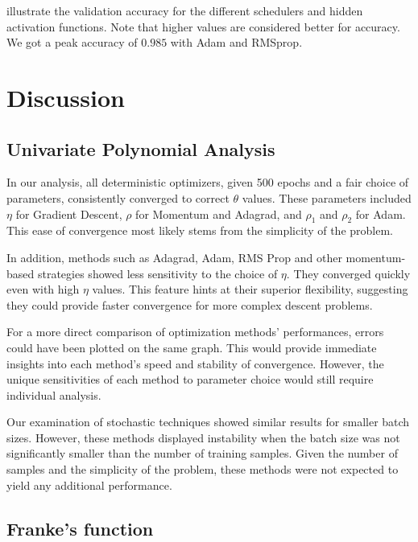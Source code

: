 \documentclass{article}
\theoremstyle{definition}
\begin{document}
 illustrate the validation accuracy for the different schedulers and hidden activation functions. Note that higher values are considered better for accuracy. We got a peak accuracy of $0.985$ with Adam and RMSprop.


\newpage
\section{Discussion}

\subsection{Univariate Polynomial Analysis}

In our analysis, all deterministic optimizers, given 500 epochs and a fair choice of parameters, consistently converged to correct $\theta$ values. These parameters included $\eta$ for Gradient Descent, $\rho$ for Momentum and Adagrad, and $\rho_1$ and $\rho_2$ for Adam. This ease of convergence most likely stems from the simplicity of the problem.

In addition, methods such as Adagrad, Adam, RMS Prop and other momentum-based strategies showed less sensitivity to the choice of $\eta$. They converged quickly even with high $\eta$ values. This feature hints at their superior flexibility, suggesting they could provide faster convergence for more complex descent problems.

For a more direct comparison of optimization methods' performances, errors could have been plotted on the same graph. This would provide immediate insights into each method's speed and stability of convergence. However, the unique sensitivities of each method to parameter choice would still require individual analysis.

Our examination of stochastic techniques showed similar results for smaller batch sizes. However, these methods displayed instability when the batch size was not significantly smaller than the number of training samples. Given the number of samples and the simplicity of the problem, these methods were not expected to yield any additional performance.


\subsection{Franke's function}
\end{document}
